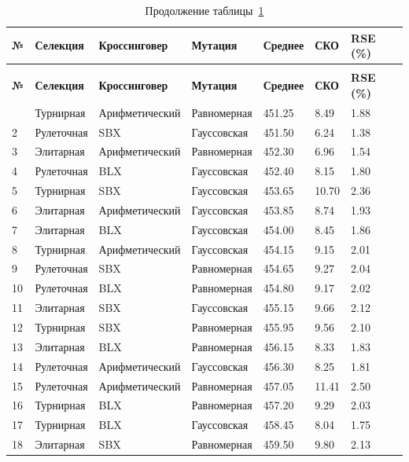 \begin{longtable}{|p{}|p{}|p{}|p{}|p{}|p{}|p{}|}
	\caption{Результаты для задачи eil51.tsp. Оптимальное решение 426.00}\label{tbl:eil51.tsp} \\
	\hline
	\textbf{№} & \textbf{Селекция} & \textbf{Кроссинговер} & \textbf{Мутация} & \textbf{Среднее} & \textbf{СКО} & \textbf{RSE (\%)} \\
	\hline
	\endfirsthead
	\caption*{Продолжение таблицы~\ref{tbl:eil51.tsp}} \\
	\hline
	\textbf{№} & \textbf{Селекция} & \textbf{Кроссинговер} & \textbf{Мутация} & \textbf{Среднее} & \textbf{СКО} & \textbf{RSE (\%)} \\
	\hline
	\endhead
	\hline
	\endfoot
	\endlastfoot
	1 & Турнирная & Арифметический & Равномерная & 451.25 & 8.49 & 1.88 \\
	\hline
	2 & Рулеточная & SBX & Гауссовская & 451.50 & 6.24 & 1.38 \\
	\hline
	3 & Элитарная & Арифметический & Равномерная & 452.30 & 6.96 & 1.54 \\
	\hline
	4 & Рулеточная & BLX & Гауссовская & 452.40 & 8.15 & 1.80 \\
	\hline
	5 & Турнирная & SBX & Гауссовская & 453.65 & 10.70 & 2.36 \\
	\hline
	6 & Элитарная & Арифметический & Гауссовская & 453.85 & 8.74 & 1.93 \\
	\hline
	7 & Элитарная & BLX & Гауссовская & 454.00 & 8.45 & 1.86 \\
	\hline
	8 & Турнирная & Арифметический & Гауссовская & 454.15 & 9.15 & 2.01 \\
	\hline
	9 & Рулеточная & SBX & Равномерная & 454.65 & 9.27 & 2.04 \\
	\hline
	10 & Рулеточная & BLX & Равномерная & 454.80 & 9.17 & 2.02 \\
	\hline
	11 & Элитарная & SBX & Гауссовская & 455.15 & 9.66 & 2.12 \\
	\hline
	12 & Турнирная & SBX & Равномерная & 455.95 & 9.56 & 2.10 \\
	\hline
	13 & Элитарная & BLX & Равномерная & 456.15 & 8.33 & 1.83 \\
	\hline
	14 & Рулеточная & Арифметический & Гауссовская & 456.30 & 8.25 & 1.81 \\
	\hline
	15 & Рулеточная & Арифметический & Равномерная & 457.05 & 11.41 & 2.50 \\
	\hline
	16 & Турнирная & BLX & Равномерная & 457.20 & 9.29 & 2.03 \\
	\hline
	17 & Турнирная & BLX & Гауссовская & 458.45 & 8.04 & 1.75 \\
	\hline
	18 & Элитарная & SBX & Равномерная & 459.50 & 9.80 & 2.13 \\
	\hline
\end{longtable}


